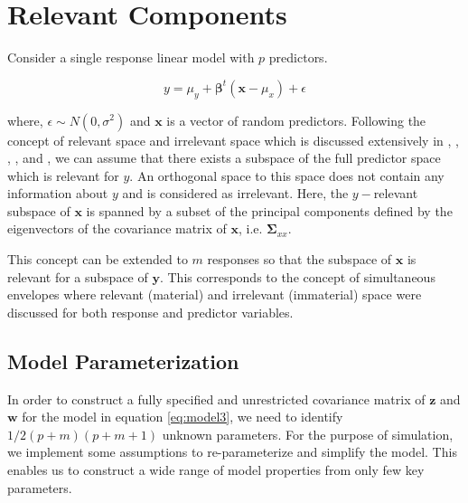\documentclass[review]{elsarticle}
\theoremstyle{definition}
\theoremstyle{definition}
\theoremstyle{definition}
\theoremstyle{remark}
\begin{document}
\section{Relevant Components}\label{relevant-components}

Consider a single response linear model with \(p\) predictors.

\[y = \mu_y + \boldsymbol{\beta}^t\left(\mathbf{x} - \mu_x\right) + \epsilon\]

where, \(\epsilon \sim N(0, \sigma^2)\) and \(\mathbf{x}\) is a vector
of random predictors. Following the concept of relevant space and
irrelevant space which is discussed extensively in
\citet{helland1994comparison}, \citet{Helland2000},
\citet{helland2012near}, \citet{cook2013envelopes}, and
\citet{saebo2015simrel}, we can assume that there exists a subspace of
the full predictor space which is relevant for \(y\). An orthogonal
space to this space does not contain any information about \(y\) and is
considered as irrelevant. Here, the \(y-\)relevant subspace of
\(\mathbf{x}\) is spanned by a subset of the principal components
defined by the eigenvectors of the covariance matrix of \(\mathbf{x}\),
i.e. \(\boldsymbol{\Sigma}_{xx}\).

This concept can be extended to \(m\) responses so that the subspace of
\(\mathbf{x}\) is relevant for a subspace of \(\mathbf{y}\). This
corresponds to the concept of simultaneous envelopes
\citep{cook2015simultaneous} where relevant (material) and irrelevant
(immaterial) space were discussed for both response and predictor
variables.

\subsection{Model Parameterization}\label{model-parameterization}

In order to construct a fully specified and unrestricted covariance
matrix of \(\mathbf{z}\) and \(\mathbf{w}\) for the model in equation
\eqref{eq:model3}, we need to identify \(1/2 (p+m)(p+m+1)\) unknown
parameters. For the purpose of simulation, we implement some assumptions
to re-parameterize and simplify the model. This enables us to construct
a wide range of model properties from only few key parameters.
\end{document}

